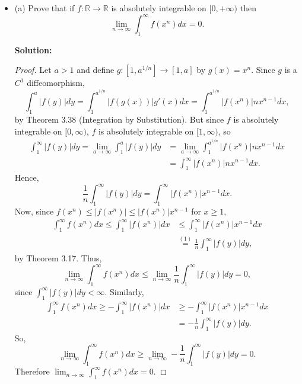 \documentclass[12pt]{article}
\begin{document}
\begin{itemize}[label={},leftmargin=4mm, itemsep=1em, parsep=1em]
  \item (a) Prove that if $f:\mathbb{R} \rightarrow \mathbb{R}$ is absolutely
    integrable on $[0, +\infty)$ then 
    \[ \lim_{n\rightarrow \infty}\int_{1}^{\infty}f(x^{n})dx = 0. \]

  {\bf Solution:}
  \begin{proof}
    Let $a > 1$ and define $g:[1, a^{1/n}]\rightarrow [1,a]$ by $g(x) = x^{n}$.
    Since $g$ is a $C^{1}$ diffeomorphism,
    \[ \int_{1}^{a}|f(y)|dy = \int_{1}^{a^{1/n}}|f(g(x))|g'(x)dx =
    \int_{1}^{a^{1/n}}|f(x^{n})|nx^{n-1}dx, \]
    by Theorem 3.38 (Integration by Substitution). But since $f$ is absolutely
    integrable on $[0, \infty)$, $f$ is absolutely integrable on $[1,\infty)$,
    so 
    \begin{align*}
      \int_{1}^{\infty}|f(y)|dy = \lim_{a\rightarrow \infty}\int_{1}^{a}|f(y)|dy & =
      \lim_{a\rightarrow \infty}\int_{1}^{a^{1/n}}|f(x^{n})|nx^{n-1}dx \\
      & = \int_{1}^{\infty}|f(x^{n})|nx^{n-1}dx.
    \end{align*}
    Hence,
    \begin{equation}
      \frac{1}{n}\int_{1}^{\infty}|f(y)|dy = \int_{1}^{\infty}|f(x^{n})|x^{n-1}dx.
    \end{equation}
    Now, since $f(x^{n}) \leq |f(x^{n})| \leq |f(x^{n})|x^{n-1}$ for $x \geq 1$,
    \begin{align*}
      \int_{1}^{\infty}f(x^{n})dx \leq \int_{1}^{\infty}|f(x^{n})|dx & \leq
      \int_{1}^{\infty}|f(x^{n})|x^{n-1}dx \\
      & \stackrel{(1)}{=} \frac{1}{n}\int_{1}^{\infty}|f(y)|dy,
    \end{align*}
    by Theorem 3.17.
    Thus,
    \[ \lim_{n\rightarrow\infty}\int_{1}^{\infty}f(x^{n})dx \leq
    \lim_{n\rightarrow \infty}\frac{1}{n}\int_{1}^{\infty}|f(y)|dy = 0, \]
    since $\int_{1}^{\infty}|f(y)|dy < \infty$. Similarly,
    \begin{align*}
      \int_{1}^{\infty}f(x^{n})dx \geq -\int_{1}^{\infty}|f(x^{n})|dx & \geq -
      \int_{1}^{\infty}|f(x^{n})|x^{n-1}dx \\
      & = -\frac{1}{n}\int_{1}^{\infty}|f(y)|dy.
    \end{align*}
    So,
    \[ \lim_{n\rightarrow \infty}\int_{1}^{\infty}f(x^{n})dx \geq
    \lim_{n\rightarrow \infty}-\frac{1}{n}\int_{1}^{\infty}|f(y)|dy = 0.\]
    Therefore $\lim_{n\rightarrow \infty}\int_{1}^{\infty}f(x^{n})dx = 0$.
  \end{proof}


\end{itemize}
\end{document}

